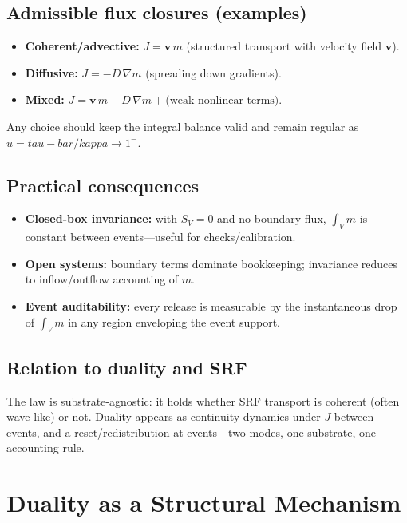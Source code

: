 \documentclass[12pt]{article}
\newcommand{\FoldTime}{\bar{\tau}}
\newcommand{\Threshold}{\kappa}
\def\FoldTime{tau-bar}%
\def\Threshold{kappa}%
\def\bar#1{#1}%
\begin{document}
\subsection[Admissible flux closures (examples)]{Admissible flux closures (examples)}
\begin{itemize}
  \item \textbf{Coherent/advective:} $J = \mathbf{v}\, m$ (structured transport with velocity field $\mathbf{v}$).
  \item \textbf{Diffusive:} $J = - D\, \nabla m$ (spreading down gradients).
  \item \textbf{Mixed:} $J = \mathbf{v}\, m - D\, \nabla m + \text{(weak nonlinear terms)}$.
\end{itemize}
Any choice should keep the integral balance valid and remain regular as $u=\FoldTime/\Threshold \to 1^{-}$.

\subsection[Practical consequences]{Practical consequences}
\begin{itemize}
  \item \textbf{Closed-box invariance:} with $S_V=0$ and no boundary flux, $\int_V m$ is constant between events—useful for checks/calibration.
  \item \textbf{Open systems:} boundary terms dominate bookkeeping; invariance reduces to inflow/outflow accounting of $m$.
  \item \textbf{Event auditability:} every release is measurable by the instantaneous drop of $\int_V m$ in any region enveloping the event support.
\end{itemize}

\subsection[Relation to duality and SRF]{Relation to duality and SRF}
The law is substrate-agnostic: it holds whether SRF transport is coherent (often wave-like) or not. Duality appears as continuity dynamics under $J$ between events, and a reset/redistribution at events—two modes, one substrate, one accounting rule.



\section{Duality as a Structural Mechanism}
\end{document}
